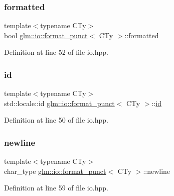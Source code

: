 \subsubsection{\texorpdfstring{formatted}{formatted}}
{\footnotesize\ttfamily template$<$typename C\+Ty$>$ \\
bool \mbox{\hyperlink{classglm_1_1io_1_1format__punct}{glm\+::io\+::format\+\_\+punct}}$<$ C\+Ty $>$\+::formatted}



Definition at line 52 of file io.\+hpp.

\mbox{\label{classglm_1_1io_1_1format__punct_a763f60aeaecec9290917ed1d83b79838}} 
\subsubsection{\texorpdfstring{id}{id}}
{\footnotesize\ttfamily template$<$typename C\+Ty$>$ \\
std\+::locale\+::id \mbox{\hyperlink{classglm_1_1io_1_1format__punct}{glm\+::io\+::format\+\_\+punct}}$<$ C\+Ty $>$\+::\mbox{\hyperlink{glad_8h_a58c2a664503e14ffb8f21012aabff3e9}{id}}\hspace{0.3cm}{\ttfamily [static]}}



Definition at line 50 of file io.\+hpp.

\mbox{\label{classglm_1_1io_1_1format__punct_a8ddf8abdb0ebbdbb7eca08d7a777956e}} 
\subsubsection{\texorpdfstring{newline}{newline}}
{\footnotesize\ttfamily template$<$typename C\+Ty$>$ \\
char\+\_\+type \mbox{\hyperlink{classglm_1_1io_1_1format__punct}{glm\+::io\+::format\+\_\+punct}}$<$ C\+Ty $>$\+::newline}



Definition at line 59 of file io.\+hpp.

\mbox{\label{classglm_1_1io_1_1format__punct_a9de1f3b7120a036ec0ab394d2036d0aa}} 
